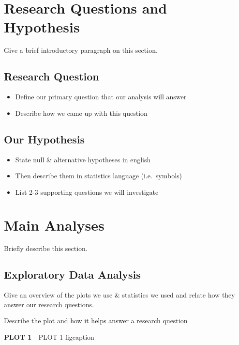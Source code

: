 \documentclass[
  american,
  11pt,
  letterpaper,
]{article}
\providecommand{\tightlist}{%
  \setlength{\itemsep}{0pt}\setlength{\parskip}{0pt}}
\begin{document}
\section{Research Questions and
Hypothesis}\label{research-questions-and-hypothesis}

Give a brief introductory paragraph on this section.

\subsection{Research Question}\label{research-question}

\begin{itemize}
\tightlist
\item
  Define our primary question that our analysis will answer
\item
  Describe how we came up with this question
\end{itemize}

\subsection{Our Hypothesis}\label{our-hypothesis}

\begin{itemize}
\tightlist
\item
  State null \& alternative hypotheses in english
\item
  Then describe them in statistics language (i.e.~symbols)
\item
  List 2-3 supporting questions we will investigate
\end{itemize}

\section{Main Analyses}\label{main-analyses}

Briefly describe this section.

\subsection{Exploratory Data Analysis}\label{exploratory-data-analysis}

Give an overview of the plots we use \& statistics we used and relate
how they answer our research questions.

Describe the plot and how it helps answer a research question

\textbf{PLOT 1} - PLOT 1 figcaption
\end{document}
